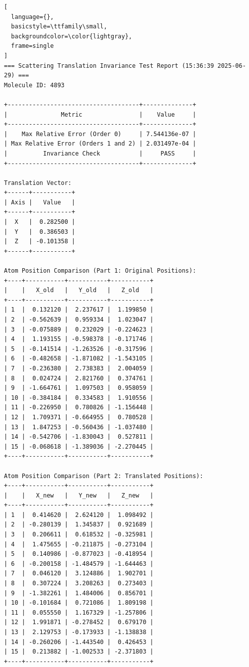 \documentclass{article}
\begin{document}
\begin{lstlisting}[
  language={},
  basicstyle=\ttfamily\small,
  backgroundcolor=\color{lightgray},
  frame=single
]
=== Scattering Translation Invariance Test Report (15:36:39 2025-06-29) ===
Molecule ID: 4893

+-------------------------------------+--------------+
|               Metric                |    Value     |
+-------------------------------------+--------------+
|    Max Relative Error (Order 0)     | 7.544136e-07 |
| Max Relative Error (Orders 1 and 2) | 2.031497e-04 |
|          Invariance Check           |     PASS     |
+-------------------------------------+--------------+

Translation Vector:
+------+-----------+
| Axis |   Value   |
+------+-----------+
|  X   |  0.282500 |
|  Y   |  0.386503 |
|  Z   | -0.101358 |
+------+-----------+

Atom Position Comparison (Part 1: Original Positions):
+----+-----------+-----------+-----------+
|    |   X_old   |   Y_old   |   Z_old   |
+----+-----------+-----------+-----------+
| 1  |  0.132120 |  2.237617 |  1.199850 |
| 2  | -0.562639 |  0.959334 |  1.023047 |
| 3  | -0.075889 |  0.232029 | -0.224623 |
| 4  |  1.193155 | -0.598378 | -0.171746 |
| 5  | -0.141514 | -1.263526 | -0.317596 |
| 6  | -0.482658 | -1.871082 | -1.543105 |
| 7  | -0.236380 |  2.738383 |  2.004059 |
| 8  |  0.024724 |  2.821760 |  0.374761 |
| 9  | -1.664761 |  1.097503 |  0.958059 |
| 10 | -0.384184 |  0.334583 |  1.910556 |
| 11 | -0.226950 |  0.780826 | -1.156448 |
| 12 |  1.709371 | -0.664955 |  0.780528 |
| 13 |  1.847253 | -0.560436 | -1.037480 |
| 14 | -0.542706 | -1.830043 |  0.527811 |
| 15 | -0.068618 | -1.389036 | -2.270445 |
+----+-----------+-----------+-----------+

Atom Position Comparison (Part 2: Translated Positions):
+----+-----------+-----------+-----------+
|    |   X_new   |   Y_new   |   Z_new   |
+----+-----------+-----------+-----------+
| 1  |  0.414620 |  2.624120 |  1.098492 |
| 2  | -0.280139 |  1.345837 |  0.921689 |
| 3  |  0.206611 |  0.618532 | -0.325981 |
| 4  |  1.475655 | -0.211875 | -0.273104 |
| 5  |  0.140986 | -0.877023 | -0.418954 |
| 6  | -0.200158 | -1.484579 | -1.644463 |
| 7  |  0.046120 |  3.124886 |  1.902701 |
| 8  |  0.307224 |  3.208263 |  0.273403 |
| 9  | -1.382261 |  1.484006 |  0.856701 |
| 10 | -0.101684 |  0.721086 |  1.809198 |
| 11 |  0.055550 |  1.167329 | -1.257806 |
| 12 |  1.991871 | -0.278452 |  0.679170 |
| 13 |  2.129753 | -0.173933 | -1.138838 |
| 14 | -0.260206 | -1.443540 |  0.426453 |
| 15 |  0.213882 | -1.002533 | -2.371803 |
+----+-----------+-----------+-----------+


\end{lstlisting}
\end{document}
